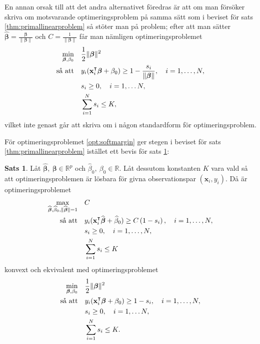 \documentclass[a4paper, 12pt]{report}
\theoremstyle{definition}
\newtheorem{thm}{Sats}[section]
\theoremstyle{remark}
\newcommand{\bfbeta}{{\boldsymbol{\beta}}}
\begin{document}
En annan orsak till att det andra alternativet föredras är att om man försöker skriva om motsvarande optimeringsproblem på samma sätt som i beviset för sats \ref{thm:primallinearproblem} så stöter man på problem; efter att man sätter $\widehat{\bfbeta}=\frac{\bfbeta}{\|\bfbeta\|}$ och $C=\frac{1}{\|\bfbeta\|}$ får man nämligen optimeringsproblemet
\begin{equation*}
\begin{aligned}
\operatornamewithlimits{min}_{\bfbeta,\beta_0} & & &\frac{1}{2}\|\bfbeta\|^2\\
\text{så att} & & &y_i(\mathbf{x}_i^\intercal\bfbeta+\beta_0)\geq 1 - \frac{s_i}{\|\bfbeta\|},\quad i=1,\dots,N,\\
& & &s_i\geq0,\quad i=1,\dots N,\\
& & &\sum_{i=1}^{N} s_i \leq K,
\end{aligned}
\end{equation*}
vilket inte genast går att skriva om i någon standardform för optimeringsproblem.

För optimeringsproblemet \ref{opt:softmargin} ger stegen i beviset för sats \ref{thm:primallinearproblem} istället ett bevis för sats \ref{thm:primalsoftmargin}:
\begin{thm}\label{thm:primalsoftmargin}
	Låt $\widehat{\bfbeta},~\bfbeta \in \mathbb{R}^p$ och $\widehat{\beta}_0,~\beta_0 \in \mathbb{R}$. Låt dessutom konstanten $K$ vara vald så att optimeringsproblemen är lösbara för givna observationspar $\left(\mathbf{x}_i,y_i\right)$. Då är optimeringsproblemet
	\begin{equation*}
	\begin{aligned}
	\operatornamewithlimits{max}_{\widehat{\bfbeta},\widehat{\beta}_0,\|\widehat{\bfbeta}\|=1} & & &C\\
	\text{så att} & & &y_i(\mathbf{x}_i^\intercal\widehat{\bfbeta}+\widehat{\beta}_0)\geq C\left(1-s_i\right),\quad i=1,\dots,N,\\
	& & &s_i\geq0,\quad i=1,\dots,N,\\
	& & &\sum_{i=1}^{N}s_i \leq K
	\end{aligned}
	\end{equation*}
	konvext och ekvivalent med optimeringsproblemet %
	\begin{equation*}
	\begin{aligned}
	\operatornamewithlimits{min}_{\bfbeta,\beta_0} & & &\frac{1}{2}\|\bfbeta\|^2\\
	\text{så att} & & &y_i(\mathbf{x}_i^\intercal\bfbeta+\beta_0)\geq 1 - s_i,\quad i=1,\dots,N,\\
	& & &s_i\geq0,\quad i=1,\dots N,\\
	& & &\sum_{i=1}^{N} s_i \leq K.
	\end{aligned}
	\end{equation*}
\end{thm}
\end{document}
